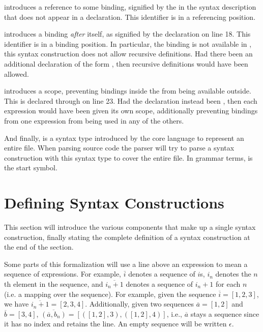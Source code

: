 \documentclass{kththesis}
\begin{document}
 introduces a reference to some binding, signified by the  in the syntax description that does not appear in a  declaration. This identifier is in a referencing position.

 introduces a binding \emph{after} itself, as signified by the  declaration on line 18. This identifier is in a binding position. In particular, the binding is not available in , this syntax construction does not allow recursive definitions. Had there been an additional declaration of the form , then recursive definitions would have been allowed.

 introduces a scope, preventing bindings inside the  from being available outside. This is declared through  on line 23. Had the declaration instead been , then each expression would have been given its own scope, additionally preventing bindings from one expression from being used in any of the others.

And finally,  is a syntax type introduced by the core language to represent an entire file. When parsing source code the parser will try to parse a syntax construction with this syntax type to cover the entire file. In grammar terms,  is the start symbol.

\section{Defining Syntax Constructions} \label{sec:defining-syntax-constructions}

This section will introduce the various components that make up a single syntax construction, finally stating the complete definition of a syntax construction at the end of the section.

Some parts of this formalization will use a line above an expression to mean a sequence of expressions. For example, $\overline{i}$ denotes a sequence of $i$s, $i_n$ denotes the $n$th element in the sequence, and $\overline{i_n + 1}$ denotes a sequence of $i_n + 1$ for each $n$ (i.e. a mapping over the sequence). For example, given the sequence $\overline{i} = [1, 2, 3]$, we have $\overline{i_n + 1} = [2, 3, 4]$. Additionally, given two sequences $\overline{a} = [1, 2]$ and $\overline{b} = [3, 4]$, $\overline{(\overline{a}, b_n)} = [([1, 2], 3), ([1, 2], 4)]$, i.e., $\overline{a}$ stays a sequence since it has no index and retains the line. An empty sequence will be written $\epsilon$.
\end{document}
